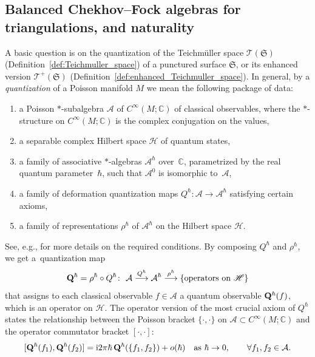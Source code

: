 \documentclass[pdftex]{sigma}
\numberwithin{equation}{section}
\theoremstyle{definition}
\begin{document}
\subsection{Balanced Chekhov--Fock algebras for triangulations, and naturality}
\label{subsec:balanced_algebras}
A basic question is on the quantization of the Teichm\"uller space $\mathscr{T}(\mathfrak{S})$ (Definition~\ref{def:Teichmuller_space}) of a punctured surface $\mathfrak{S}$, or its enhanced version $\mathscr{T}^+(\mathfrak{S})$ (Definition~\ref{def:enhanced_Teichmuller_space}). In general, by a {\em quantization} of a Poisson manifold $M$ we mean the following package of data:
\begin{enumerate}[label={\rm (Q\arabic*)}]\itemsep=0pt
\item\label{Q1} a Poisson $*$-subalgebra $\mathcal{A}$ of $C^\infty(M;\mathbb{C})$ of classical observables, where the $*$-structure on $C^\infty(M;\mathbb{C})$ is the complex conjugation on the values,
\item a separable complex Hilbert space $\mathscr{H}$ of quantum states,
\item a family of associative $*$-algebras $\mathcal{A}^\hbar$ over~$\mathbb{C}$, parametrized by the real quantum parameter~$\hbar$, such that $\mathcal{A}^0$ is isomorphic to~$\mathcal{A}$,
\item\label{Q4} a family of deformation quantization maps $Q^\hbar \colon \mathcal{A} \to \mathcal{A}^\hbar$ satisfying certain axioms,
\item\label{Q5} a family of representations $\rho^\hbar$ of $\mathcal{A}^\hbar$ on the Hilbert space $\mathscr{H}$.
\end{enumerate}
See, e.g., \cite{KS} for more details on the required conditions. By composing $Q^\hbar$ and $\rho^\hbar$, we get a~quantization map
\[
{\bf Q}^\hbar = \rho^\hbar \circ Q^\hbar \colon \ \mathcal{A} \stackrel{Q^\hbar}{\longrightarrow} \mathcal{A}^\hbar \stackrel{\rho^\hbar}{\longrightarrow} \{\mbox{operators on $\mathscr{H}$}\}
\]
that assigns to each classical observable $f\in \mathcal{A}$ a quantum observable ${\bf Q}^\hbar(f)$, which is an operator on $\mathscr{H}$. The operator version of the most crucial axiom of $Q^\hbar$ states the relationship between the Poisson bracket $\{\cdot,\cdot\}$ on $\mathcal{A}\subset C^\infty(M;\mathbb{C})$ and the operator commutator bracket $[\cdot,\cdot]$:
\[
[{\bf Q}^\hbar(f_1), {\bf Q}^\hbar(f_2)] = {\rm i} 2\pi \hbar \, {\bf Q}^\hbar(\{f_1,f_2\}) + o(\hbar) \quad \mbox{as $\hbar \to 0$}, \qquad \forall f_1,f_2 \in \mathcal{A}.
\]
\end{document}
